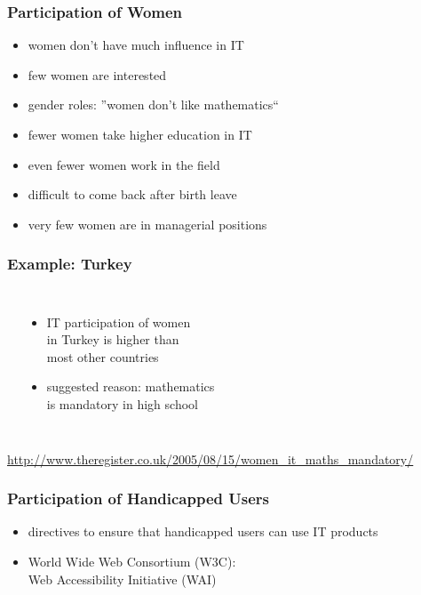 \documentclass[dvipsnames]{beamer}
\theoremstyle{plain}
\begin{document}
\begin{frame}
  \frametitle{Participation of Women}

  \begin{itemize}
    \item women don't have much influence in IT

    \bigskip
    \item few women are interested
    \item gender roles: ''women don't like mathematics``

    \medskip
    \item fewer women take higher education in IT

    \medskip
    \item even fewer women work in the field
    \item difficult to come back after birth leave

    \medskip
    \item very few women are in managerial positions
  \end{itemize}
\end{frame}

\begin{frame}
  \frametitle{Example: Turkey}

  \begin{columns}
    \begin{center}
    \end{center}

    \begin{itemize}
      \item IT participation of women\\
        in Turkey is higher than\\
        most other countries
      \item suggested reason: mathematics\\
        is mandatory in high school
    \end{itemize}
  \end{columns}

  \medskip
  \tiny{\url{http://www.theregister.co.uk/2005/08/15/women_it_maths_mandatory/}}\\
\end{frame}

\begin{frame}
  \frametitle{Participation of Handicapped Users}

  \begin{itemize}
    \item directives to ensure that handicapped users can use IT products
    \item World Wide Web Consortium (W3C):\\
      Web Accessibility Initiative (WAI)
  \end{itemize}
\end{frame}
\end{document}
